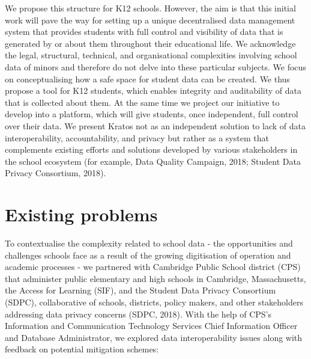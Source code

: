\documentclass{article}
\begin{document}
\bigbreak
We propose this structure for K12 schools. However, the aim is that this initial work will pave the way for setting up a unique decentralised data management system that provides students with full control and visibility of data that is generated by or about them throughout their educational life. We acknowledge the legal, structural, technical, and organisational complexities involving school data of minors and therefore do not delve into these particular subjects. We focus on conceptualising how a safe space for student data can be created. We thus propose a tool for K12 students, which enables integrity and auditability of data that is collected about them. At the same time we project our initiative to develop into a platform, which will give students, once independent, full control over their data. 
\bigbreak
We present Kratos not as an independent solution to lack of data interoperability, accountability, and privacy but rather as a system that complements existing efforts and solutions developed by various stakeholders in the school ecosystem (for example, Data Quality Campaign, 2018; Student Data Privacy Consortium, 2018).

\section{Existing problems}
To contextualise the complexity related to school data - the opportunities and challenges schools face as a result of the growing digitisation of operation and academic processes - we partnered with Cambridge Public School district (CPS) that administer public elementary and high schools in Cambridge, Massachusetts, the Access for Learning (SIF), and the Student Data Privacy Consortium (SDPC), collaborative of schools, districts, policy makers, and other stakeholders addressing data privacy concerns (SDPC, 2018). With the help of CPS's Information and Communication Technology Services Chief Information Officer and Database Administrator, we explored data interoperability issues along with feedback on potential mitigation schemes:
\end{document}
